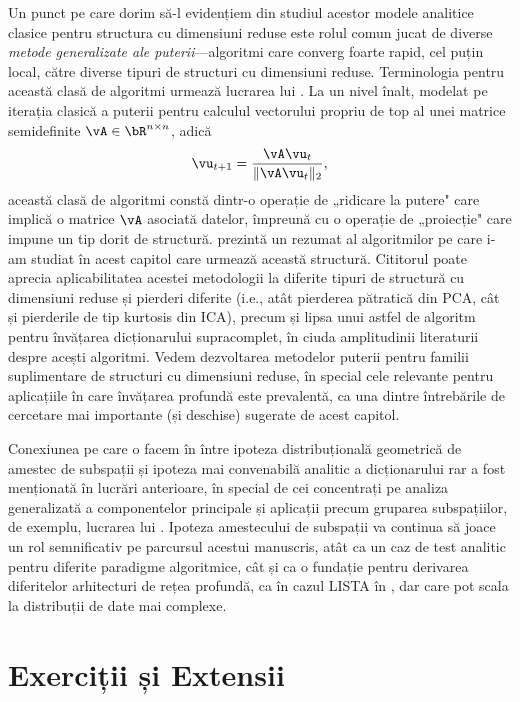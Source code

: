 \documentclass[../../book-main_ro.tex]{subfiles}
\begin{document}
Un punct pe care dorim să-l evidențiem din studiul acestor modele
analitice clasice pentru structura cu dimensiuni reduse este rolul comun jucat de
diverse \textit{metode generalizate ale puterii}---algoritmi care converg foarte rapid,
cel puțin local, către diverse tipuri de structuri cu dimensiuni reduse. Terminologia
pentru această clasă de algoritmi urmează lucrarea lui \textcite{JourneeM2010}.
La un nivel înalt, modelat pe iterația clasică a puterii pentru calculul
vectorului propriu de top al unei matrice semidefinite $\vA \in \bR^{n \times n}$, adică
\begin{equation}
    \vu_{t+1} = \frac{\vA \vu_{t}}{\norm{\vA \vu_{t}}_2},
\end{equation}
această clasă de algoritmi constă dintr-o operație de „ridicare la putere" care implică o matrice
$\vA$ asociată datelor, împreună cu o operație de „proiecție" care
impune un tip dorit de structură.  prezintă
un rezumat al algoritmilor pe care i-am studiat în acest capitol care urmează această
structură. Cititorul poate aprecia aplicabilitatea acestei metodologii la
diferite tipuri de structură cu dimensiuni reduse și pierderi diferite (i.e., atât
pierderea pătratică din PCA, cât și pierderile de tip kurtosis din ICA), precum și
lipsa unui astfel de algoritm pentru învățarea dicționarului supracomplet, în ciuda
amplitudinii literaturii despre acești algoritmi. Vedem dezvoltarea metodelor
puterii pentru familii suplimentare de structuri cu dimensiuni reduse, în special cele
relevante pentru aplicațiile în care învățarea profundă este prevalentă, ca una dintre
întrebările de cercetare mai importante (și deschise) sugerate de acest capitol.

Conexiunea pe care o facem în  între ipoteza
distribuțională geometrică de amestec de subspații și ipoteza mai convenabilă
analitic a dicționarului rar a fost menționată în lucrări anterioare,
în special de cei concentrați pe analiza generalizată a componentelor principale
și aplicații precum gruparea subspațiilor, de exemplu, lucrarea lui \textcite{GPCA}.
Ipoteza amestecului de subspații va continua să joace un rol semnificativ
pe parcursul acestui manuscris, atât ca un caz de test analitic pentru diferite
paradigme algoritmice, cât și ca o fundație pentru derivarea diferitelor arhitecturi
de rețea profundă, ca în cazul LISTA în , dar care pot scala la
distribuții de date mai complexe.

\section{Exerciții și Extensii}
\end{document}
